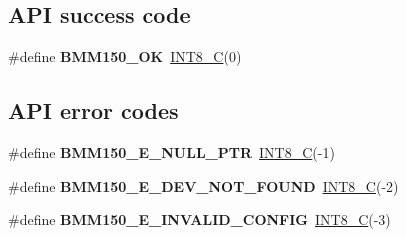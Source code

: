 \subsection*{A\+PI success code}
\begin{DoxyCompactItemize}
\item 
\mbox{\label{group___b_m_m150_gaaeab15ff61e3bf4171b5f519bf7dc560}} 
\#define {\bfseries B\+M\+M150\+\_\+\+OK}~\hyperlink{group___b_m_m150_ga1eaa7db37089dcdfb60227725c9c1585}{I\+N\+T8\+\_\+C}(0)
\end{DoxyCompactItemize}
\subsection*{A\+PI error codes}
\begin{DoxyCompactItemize}
\item 
\mbox{\label{group___b_m_m150_ga888858436e873087738b04b5cf6cad6f}} 
\#define {\bfseries B\+M\+M150\+\_\+\+E\+\_\+\+N\+U\+L\+L\+\_\+\+P\+TR}~\hyperlink{group___b_m_m150_ga1eaa7db37089dcdfb60227725c9c1585}{I\+N\+T8\+\_\+C}(-\/1)
\item 
\mbox{\label{group___b_m_m150_ga15beb9eb9d22b3580f6e556c032c28b7}} 
\#define {\bfseries B\+M\+M150\+\_\+\+E\+\_\+\+D\+E\+V\+\_\+\+N\+O\+T\+\_\+\+F\+O\+U\+ND}~\hyperlink{group___b_m_m150_ga1eaa7db37089dcdfb60227725c9c1585}{I\+N\+T8\+\_\+C}(-\/2)
\item 
\mbox{\label{group___b_m_m150_ga8ea6d4a62d190271e5d81d9ba841fc52}} 
\#define {\bfseries B\+M\+M150\+\_\+\+E\+\_\+\+I\+N\+V\+A\+L\+I\+D\+\_\+\+C\+O\+N\+F\+IG}~\hyperlink{group___b_m_m150_ga1eaa7db37089dcdfb60227725c9c1585}{I\+N\+T8\+\_\+C}(-\/3)
\end{DoxyCompactItemize}
